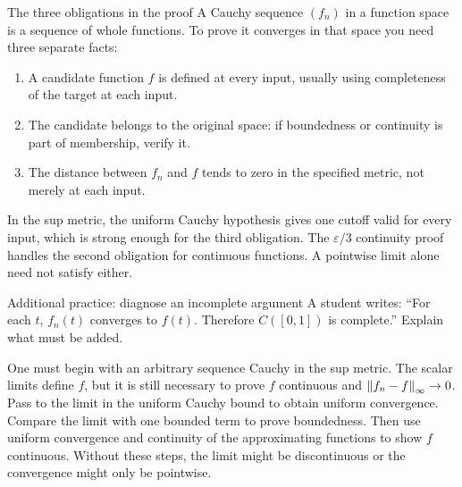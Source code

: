 \begin{note}{The three obligations in the proof}
A Cauchy sequence $(f_n)$ in a function space is a sequence of whole functions. To prove it converges in that space you need three separate facts:
\begin{enumerate}
\item A candidate function $f$ is defined at every input, usually using completeness of the target at each input.
\item The candidate belongs to the original space: if boundedness or continuity is part of membership, verify it.
\item The distance between $f_n$ and $f$ tends to zero in the specified metric, not merely at each input.
\end{enumerate}
In the sup metric, the uniform Cauchy hypothesis gives one cutoff valid for every input, which is strong enough for the third obligation. The $\varepsilon/3$ continuity proof handles the second obligation for continuous functions. A pointwise limit alone need not satisfy either.
\end{note}
\begin{exam}{Additional practice: diagnose an incomplete argument}
A student writes: ``For each $t$, $f_n(t)$ converges to $f(t)$. Therefore $C([0,1])$ is complete.'' Explain what must be added.
\end{exam}
\begin{answer}
One must begin with an arbitrary sequence Cauchy in the sup metric. The scalar limits define $f$, but it is still necessary to prove $f$ continuous and $\left\lVert f_n-f\right\rVert_\infty\to0$. Pass to the limit in the uniform Cauchy bound to obtain uniform convergence. Compare the limit with one bounded term to prove boundedness. Then use uniform convergence and continuity of the approximating functions to show $f$ continuous. Without these steps, the limit might be discontinuous or the convergence might only be pointwise.
\end{answer}


